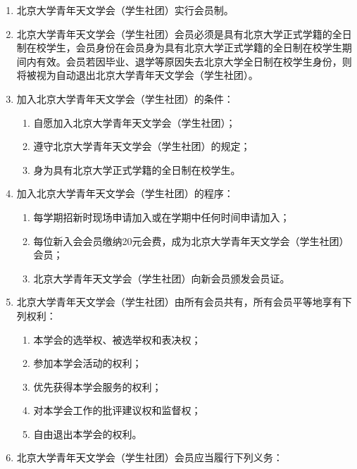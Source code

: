 \begin{enumerate}[resume]
    \item 北京大学青年天文学会（学生社团）实行会员制。
    
    \item 北京大学青年天文学会（学生社团）会员必须是具有北京大学正式学籍的全日制在校学生，会员身份在会员身为具有北京大学正式学籍的全日制在校学生期间内有效。会员若因毕业、退学等原因失去北京大学全日制在校学生身份，则将被视为自动退出北京大学青年天文学会（学生社团）。
    
    \item 加入北京大学青年天文学会（学生社团）的条件：
    
    \begin{enumerate}
        \item 自愿加入北京大学青年天文学会（学生社团）；
        \item 遵守北京大学青年天文学会（学生社团）的规定；
        \item 身为具有北京大学正式学籍的全日制在校学生。
    \end{enumerate}
    
    \item 加入北京大学青年天文学会（学生社团）的程序：
    
    \begin{enumerate}
        \item 每学期招新时现场申请加入或在学期中任何时间申请加入；
        \item 每位新入会会员缴纳20元会费，成为北京大学青年天文学会（学生社团）会员；
        \item 北京大学青年天文学会（学生社团）向新会员颁发会员证。
    \end{enumerate}
    
    \item 北京大学青年天文学会（学生社团）由所有会员共有，所有会员平等地享有下列权利：
    
    \begin{enumerate}
        \item 本学会的选举权、被选举权和表决权；
        \item 参加本学会活动的权利；
        \item 优先获得本学会服务的权利；
        \item 对本学会工作的批评建议权和监督权；
        \item 自由退出本学会的权利。
    \end{enumerate}
    
    \item 北京大学青年天文学会（学生社团）会员应当履行下列义务：
    

\end{enumerate}
